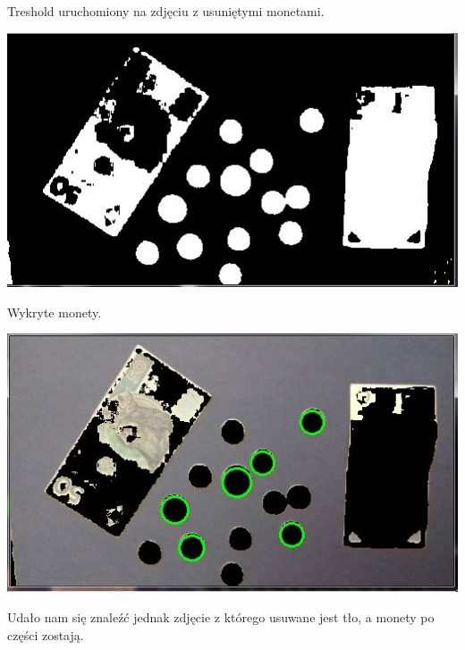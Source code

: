 \documentclass[12pt]{article}
\begin{document}
Treshold uruchomiony na zdjęciu z usuniętymi monetami.

\includegraphics[scale=0.4]{removeSilverTresh}

Wykryte monety.

\includegraphics[scale=0.4]{removeSilverResult}

Udało nam się znaleźć jednak zdjęcie z którego usuwane jest tło, a monety po części zostają.
\end{document}
